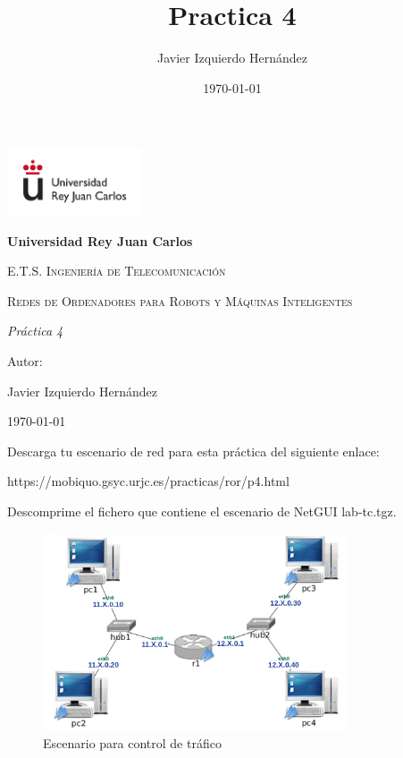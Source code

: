 \documentclass[12pt, a4paper]{report}
\title{Practica 4}
\author{Javier Izquierdo Hernández}
\date{\today}
\begin{document}
	\begin{titlepage}
		\centering
		{\includegraphics[width=0.3\textwidth]{logo}\par}
		\vspace{1cm}
		{\bfseries\LARGE Universidad Rey Juan Carlos \par}
		\vspace{1cm}
		{\scshape\Large E.T.S. Ingeniería de Telecomunicación \par}
		\vspace{3cm}
		{\scshape\Huge Redes de Ordenadores para Robots y Máquinas Inteligentes \par}
		\vspace{3cm}
		{\itshape\Large Práctica 4\par}
		\vfill
		{\Large Autor: \par}
		{\Large Javier Izquierdo Hernández \par}
		\vfill
		{\Large \today \par}
	\end{titlepage}

\newpage
\renewcommand{\contentsname}{Contenidos}
\tableofcontents
\newpage

Descarga tu escenario de red para esta práctica del siguiente enlace:

\begin{center}
https://mobiquo.gsyc.urjc.es/practicas/ror/p4.html
\end{center}

Descomprime el fichero que contiene el escenario de NetGUI lab-tc.tgz.

\begin{figure}[h]
	\centering
	\includegraphics[width=0.8\textwidth]{enunciado1}
	\caption{Escenario para control de tráfico}
\end{figure}
\end{document}
